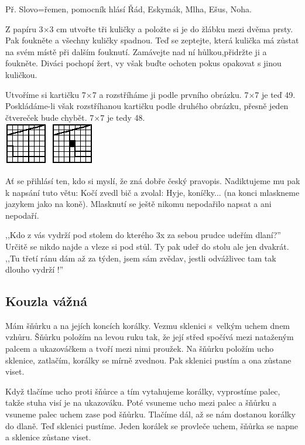 Př. Slovo=řemen, pomocník hlásí Řád, Eskymák, Mlha, Ešus, Noha.


Z papíru 3$\times$3 cm utvořte tři kuličky a položte si je do 
žlábku mezi dvěma prsty. Pak foukněte a všechny kuličky spadnou. 
Teď se zeptejte, která kulička má zůstat na svém místě při dalším 
fouknutí. Zamávejte nad ní hůlkou,přidržte ji a foukněte. Diváci
pochopí žert, vy však buďte ochoten pokus opakovat s jinou kuličkou.


Utvoříme si kartičku 7$\times$7 a rozstříháme ji podle prvního
obrázku. 7$\times$7 je teď 49. Poskládáme-li však rozstříhanou
kartičku podle druhého obrázku, přesně jeden čtvereček bude
chybět. 7$\times$7 je tedy 48.\\
\includegraphics{kolik7x7}


Ať se přihlásí ten, kdo si myslí, že zná dobře český pravopis. 
Nadiktujeme mu pak k napsání tuto větu: Kočí zvedl bič a zvolal: 
Hyje, koníčky...  (na konci mlaskneme jazykem jako na koně). 
Mlasknutí se ještě nikomu nepodařilo napsat a ani nepodaří.


,,Kdo z vás vydrží pod stolem do kterého 3x za sebou prudce 
udeřím dlaní?'' Určitě se nikdo najde a vleze si pod stůl. Ty 
pak udeř do stolu ale jen dvakrát. ,,Tu třetí ránu dám až za 
týden, jsem sám zvědav, jestli odvážlivec tam tak dlouho vydrží 
!''


\subsection{Kouzla vážná}

Mám šňůrku a na jejích koncích korálky. Vezmu sklenici 
s~velkým uchem dnem vzhůru. Šňůrku položím na levou ruku 
tak, že její střed spočívá mezi nataženým palcem a ukazováčkem 
a tvoří mezi nimi proužek. Na šňůrku položím ucho sklenice, zatlačím, 
korálky se mírně zvednou. Pak sklenici pustím a ona zůstane viset.

Když tlačíme ucho proti šňůrce a tím vytahujeme korálky, 
vyprostíme palec, takže stuha visí je na ukazováku. Poté vsuneme 
ucho mezi palec a šňůrku a vsuneme palec uchem zase pod šňůrku. 
Tlačíme dál, až se nám dostanou korálky do dlaně. Teď sklenici 
pustíme. Jeden korálek se provleče uchem, šňůrka se napne a sklenice 
zůstane viset.


